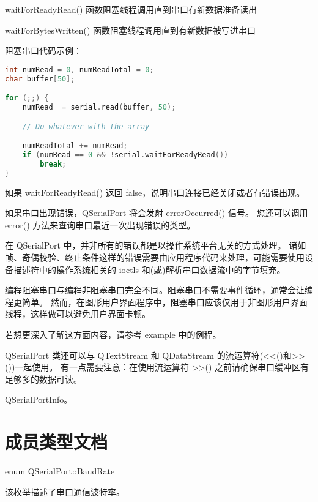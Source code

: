 \begin{compactitem}[\arr]
\item waitForReadyRead() 函数阻塞线程调用直到串口有新数据准备读出
\item waitForBytesWritten() 函数阻塞线程调用直到有新数据被写进串口
\end{compactitem}

阻塞串口代码示例：

\begin{lstlisting}[language=C++]
int numRead = 0, numReadTotal = 0;
char buffer[50];

for (;;) {
    numRead  = serial.read(buffer, 50);

    // Do whatever with the array

    numReadTotal += numRead;
    if (numRead == 0 && !serial.waitForReadyRead())
        break;
}
\end{lstlisting}

如果 waitForReadyRead() 返回 false，说明串口连接已经关闭或者有错误出现。

如果串口出现错误，QSerialPort 将会发射 errorOccurred() 信号。
您还可以调用 error() 方法来查询串口最近一次出现错误的类型。

\begin{notice}
在 QSerialPort 中，并非所有的错误都是以操作系统平台无关的方式处理。
诸如帧、奇偶校验、终止条件这样的错误需要由应用程序代码来处理，可能需要使用设备描述符中的操作系统相关的 ioctls 和(或)解析串口数据流中的字节填充。
\end{notice}

编程阻塞串口与编程非阻塞串口完全不同。阻塞串口不需要事件循环，通常会让编程更简单。
然而，在图形用户界面程序中，阻塞串口应该仅用于非图形用户界面线程，这样做可以避免用户界面卡顿。

若想更深入了解这方面内容，请参考 example 中的例程。

QSerialPort 类还可以与 QTextStream 和 QDataStream 的流运算符(<<()和>>())一起使用。
有一点需要注意：在使用流运算符 >>() 之前请确保串口缓冲区有足够多的数据可读。

\begin{seeAlso}
QSerialPortInfo。
\end{seeAlso}

\section{成员类型文档}

enum QSerialPort::BaudRate

该枚举描述了串口通信波特率。

